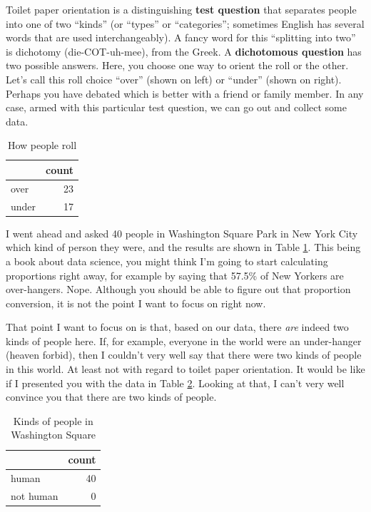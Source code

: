 \documentclass[openany]{book}
\begin{document}
Toilet paper orientation is a distinguishing \textbf{test question} that separates people into one of two ``kinds'' (or ``types'' or ``categories''; sometimes English has several words that are used interchangeably). A fancy word for this ``splitting into two'' is dichotomy (die-COT-uh-mee), from the Greek. A \textbf{dichotomous question} has two possible answers. Here, you choose one way to orient the roll or the other. Let's call this roll choice ``over'' (shown on left) or ``under'' (shown on right). Perhaps you have debated which is better with a friend or family member. In any case, armed with this particular test question, we can go out and collect some data.

\begin{table}[!h]

\caption{\label{tab:tp-table}How people roll}
\centering
\begin{tabular}[t]{lr}
\toprule
 & count\\
\midrule
over & 23\\
under & 17\\
\bottomrule
\end{tabular}
\end{table}

I went ahead and asked 40 people in Washington Square Park in New York City which kind of person they were, and the results are shown in Table \ref{tab:tp-table}. This being a book about data science, you might think I'm going to start calculating proportions right away, for example by saying that 57.5\% of New Yorkers are over-hangers.
Nope. Although you should be able to figure out that proportion conversion, it is not the point I want to focus on right now.

That point I want to focus on is that, based on our data, there \emph{are} indeed two kinds of people here. If, for example, everyone in the world were an under-hanger (heaven forbid), then I couldn't very well say that there were two kinds of people in this world. At least not with regard to toilet paper orientation. It would be like if I presented you with the data in Table \ref{tab:dumb-table}. Looking at that, I can't very well convince you that there are two kinds of people.

\begin{table}[!h]

\caption{\label{tab:dumb-table}Kinds of people in Washington Square}
\centering
\begin{tabular}[t]{lr}
\toprule
  & count\\
\midrule
human & 40\\
not human & 0\\
\bottomrule
\end{tabular}
\end{table}
\end{document}
